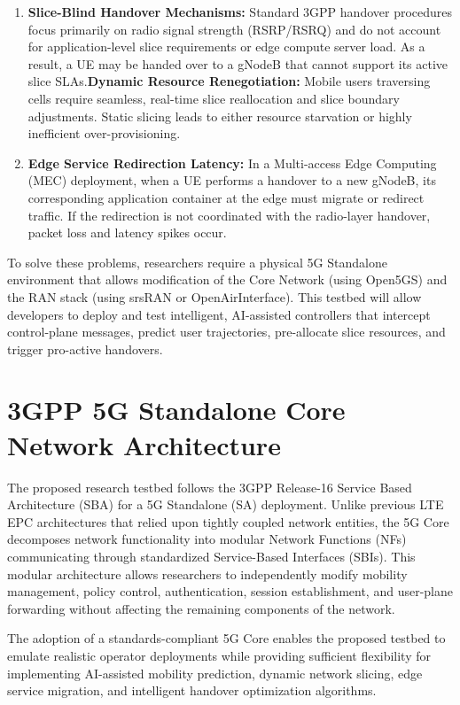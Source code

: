 \documentclass[12pt,a4paper]{article}\usepackage[a4paper,margin=1in]{geometry}\usepackage{graphicx}\usepackage{longtable}\usepackage{booktabs}\usepackage{hyperref}\usepackage{enumitem}\usepackage{amsmath}\usepackage{tikz}\usepackage{pgfgantt}\usepackage{setspace}\setstretch{1.15}\usetikzlibrary{positioning,arrows.meta,shapes.geometric}
\begin{document}
	\begin{enumerate}
		\item \textbf{Slice-Blind Handover Mechanisms:} Standard 3GPP handover procedures focus primarily on radio signal strength (RSRP/RSRQ) and do not account for application-level slice requirements or edge compute server load. As a result, a UE may be handed over to a gNodeB that cannot support its active slice SLAs.\textbf{Dynamic Resource Renegotiation:} Mobile users traversing cells require seamless, real-time slice reallocation and slice boundary adjustments. Static slicing leads to either resource starvation or highly inefficient over-provisioning.
		\item \textbf{Edge Service Redirection Latency:} In a Multi-access Edge Computing (MEC) deployment, when a UE performs a handover to a new gNodeB, its corresponding application container at the edge must migrate or redirect traffic. If the redirection is not coordinated with the radio-layer handover, packet loss and latency spikes occur.
	\end{enumerate}
	
	To solve these problems, researchers require a physical 5G Standalone environment that allows modification of the Core Network (using Open5GS) and the RAN stack (using srsRAN or OpenAirInterface). This testbed will allow developers to deploy and test intelligent, AI-assisted controllers that intercept control-plane messages, predict user trajectories, pre-allocate slice resources, and trigger pro-active handovers.
	
	\section{3GPP 5G Standalone Core Network Architecture}
	
	The proposed research testbed follows the 3GPP Release-16 Service Based Architecture (SBA) for a 5G Standalone (SA) deployment. Unlike previous LTE EPC architectures that relied upon tightly coupled network entities, the 5G Core decomposes network functionality into modular Network Functions (NFs) communicating through standardized Service-Based Interfaces (SBIs). This modular architecture allows researchers to independently modify mobility management, policy control, authentication, session establishment, and user-plane forwarding without affecting the remaining components of the network.
	
	The adoption of a standards-compliant 5G Core enables the proposed testbed to emulate realistic operator deployments while providing sufficient flexibility for implementing AI-assisted mobility prediction, dynamic network slicing, edge service migration, and intelligent handover optimization algorithms.
	
\end{document}
